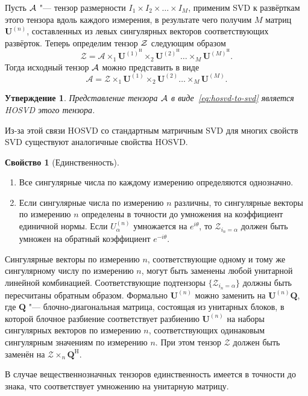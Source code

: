 \documentclass[specialist,
    substylefile = spbu_report.rtx,
    subf,href,colorlinks=true, 12pt]{disser}
\theoremstyle{plain}
\newtheorem{statement}{Утверждение}[section]
\theoremstyle{definition}
\newtheorem{property}{Свойство}[section]
\theoremstyle{remark}
\begin{document}
    Пусть $\mathcal{A}$ "--- тензор размерности $I_1\times I_2\times\ldots\times I_M$, применим SVD к развёрткам этого тензора вдоль каждого
    измерения, в результате чего получим $M$ матриц $\mathbf{U}^{(n)}$,
    составленных из левых сингулярных векторов соответствующих развёрток.
    Теперь определим тензор $\mathcal{Z}$ следующим образом
    \[
        \mathcal{Z}=\mathcal{A}\times_1 \mathbf{U}^{(1)^\mathrm{H}}\times_2 \mathbf{U}^{(2)^\mathrm{H}}\ldots \times_M
        \mathbf{U}^{(M)^\mathrm{H}}.
    \]
    Тогда исходный тензор $\mathcal{A}$ можно представить в виде
    \begin{equation}
        \label{eq:hosvd-to-svd}
        \mathcal{A} = \mathcal{Z}\times_1 \mathbf{U}^{(1)}\times_2 \mathbf{U}^{(2)}\ldots \times_M \mathbf{U}^{(M)}.
    \end{equation}

    \begin{statement}
        Представление тензора $\mathcal{A}$ в виде~\eqref{eq:hosvd-to-svd} является HOSVD этого тензора.
        \label{state:hosvd-to-svd}
    \end{statement}

    Из-за этой связи HOSVD со стандартным матричным SVD для многих свойств SVD существуют аналогичные свойства HOSVD\@.
    \begin{property}[Единственность]
        \leavevmode
        \begin{enumerate}
            \item Все сингулярные числа по каждому измерению определяются однозначно.
            \item Если сингулярные числа по измерению $n$ различны, то сингулярные векторы по измерению $n$ определены
            в точности до умножения на коэффициент единичной нормы.
            Если $U_\alpha^{(n)}$ умножается на $e^{i\theta}$, то $\mathcal{Z}_{i_n=\alpha}$ должен быть умножен на обратный
            коэффициент $e^{-i\theta}$.
        \end{enumerate}
        Сингулярные векторы по измерению $n$, соответствующие одному и тому же сингулярному числу по измерению $n$,
        могут быть заменены любой унитарной линейной комбинацией.
        Соответствующие подтензоры $\{\mathcal{Z}_{i_n=\alpha}\}$ должны быть пересчитаны обратным образом.
        Формально $\mathbf{U}^{(n)}$ можно заменить на $\mathbf{U}^{(n)}\mathbf{Q}$, где $\mathbf{Q}$ "--- блочно-диагональная
        матрица, состоящая из унитарных блоков, в которой блочное разбиение соответствует разбиению $\mathbf{U}^{(n)}$
        на наборы сингулярных векторов по измерению $n$, соответствующих одинаковым сингулярным значениям по измерению $n$.
        При этом тензор $\mathcal{Z}$ должен быть заменён на $\mathcal{Z}\times_{n} \mathbf{Q}^{\mathrm{H}}$.

        В случае вещественнозначных тензоров единственность имеется в точности до знака, что соответствует
        умножению на унитарную матрицу.
    \end{property}
\end{document}
